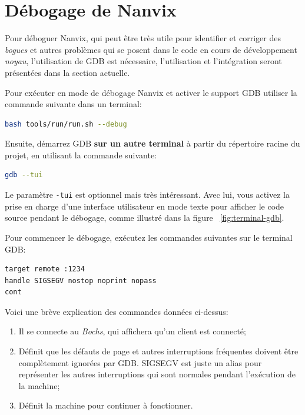 \documentclass[11pt]{article}
\begin{document}
\section{Débogage de Nanvix}
\label{sec:debug}



Pour déboguer Nanvix, qui peut être très utile pour identifier
et corriger des \textit{bogues} et autres problèmes qui se posent
dans le code en cours de développement \textit {noyau},
l'utilisation de GDB est nécessaire, l'utilisation et l'intégration
seront présentées dans la section actuelle. 

Pour exécuter en mode de débogage Nanvix et activer le support GDB
utiliser la commande suivante dans un terminal: \\

\begin{lstlisting}[language=bash,numbers=none,frame=single]
bash tools/run/run.sh --debug
\end{lstlisting}

\vspace{0.3cm}
Ensuite, démarrez GDB \textbf {sur un autre terminal} à
partir du répertoire racine du projet, en utilisant la commande
suivante: \\

\begin{lstlisting}[language=bash,numbers=none,frame=single]
gdb --tui
\end{lstlisting}

Le paramètre \texttt{-tui} est optionnel mais très intéressant. Avec
lui, vous activez la prise en charge d'une interface utilisateur en
mode texte pour afficher le code source pendant le débogage, comme
illustré dans la figure ~\ref{fig:terminal-gdb}.

Pour commencer le débogage, exécutez les commandes suivantes sur le
terminal GDB: \\

\begin{lstlisting}[language=sh,numbers=none,frame=single]
target remote :1234
handle SIGSEGV nostop noprint nopass
cont
\end{lstlisting}

\vspace{0.3cm}
Voici une brève explication des commandes données ci-dessus:

\begin{enumerate}
	\item Il se connecte au \textit{Bochs}, qui affichera  qu'un client est connecté;
	\item Définit que les défauts de page et autres interruptions
          fréquentes doivent être complètement ignorées par GDB. SIGSEGV
          est juste un alias pour représenter les autres interruptions qui
          sont normales pendant l'exécution de la machine;
	\item Définit la machine pour continuer à fonctionner.
\end{enumerate}
\end{document}
